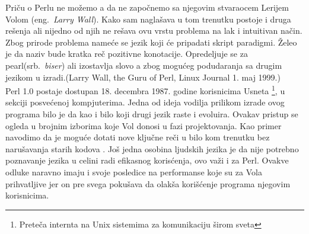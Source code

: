 \documentclass[a4paper]{article}
\begin{document}
Priču o Perlu ne možemo a da ne započnemo sa njegovim stvaraocem Lerijem Volom (eng.~{\em Larry Wall}). Kako sam naglašava u tom trenutku postoje i druga rešenja ali nijedno od njih ne rešava ovu vrstu problema na lak i intuitivan način. Zbog prirode problema nameće se jezik koji će pripadati skript paradigmi. Želeo je da naziv bude kratka reč pozitivne konotacije. Opredeljuje se za pearl(srb.~{\em biser}) ali izostavlja slovo a zbog mogućeg podudaranja sa drugim jezikom u izradi.(Larry Wall, the Guru of Perl, Linux Journal 1. maj 1999.)\\

Perl 1.0 postaje dostupan 18. decembra 1987. godine korisnicima Usneta \footnote{Preteča internta na Unix sistemima za komunikaciju širom sveta}, u sekciji posvećenoj kompjuterima. Jedna od ideja vodilja prilikom izrade ovog programa bilo je da kao i bilo koji drugi jezik raste i evoluira. Ovakav pristup se ogleda u brojnim izborima koje Vol donosi u fazi projektovanja. Kao primer navodimo da je moguće  dotati nove ključne reči u bilo kom trenutku bez narušavanja starih kodova \cite{id}. Još jedna osobina ljudskih jezika je da nije potrebno poznavanje jezika u celini radi efikasnog korisćenja, ovo važi i za Perl. Ovakve odluke naravno imaju i svoje posledice na performanse koje su za Vola prihvatljive jer on pre svega pokušava da olakša korišćenje programa njegovim korisnicima.\\
\end{document}
